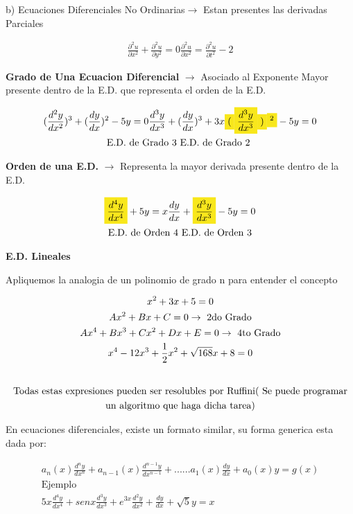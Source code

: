 \documentclass{article}
\begin{document}
b) Ecuaciones Diferenciales No Ordinarias$\rightarrow$  Estan presentes las derivadas Parciales


\begin{gather*}
\frac{\partial ^{2}u}{\partial x^{2}}+\frac{\partial ^{2}u}{\partial y^{2}} = 0       \frac{\partial ^{2}u}{\partial x^{2}}= \frac{\partial ^{2}u}{\partial t^{2}} -2
\end{gather*}


\textbf{Grado de Una Ecuacion Diferencial} $\rightarrow$  Asociado al \colorbox[RGB]{248,231,28}{Exponente Mayor} presente dentro de la E.D. que representa el orden de la E.D.


\begin{gather*}
(\frac{d^{2}y}{dx^{2}})^{3} + (\frac{dy}{dx})^{2}  - 5y = 0           \frac{d^{3}y}{dx^{3}} + (\frac{dy}{dx})^{3} +3x\text{\colorbox[RGB]{248,231,28}{$($}}\text{\colorbox[RGB]{248,231,28}{$\frac{d^{3}y}{dx^{3}}$}}\text{\colorbox[RGB]{248,231,28}{$)$}}\text{\colorbox[RGB]{248,231,28}{$^{2}$}}- 5y = 0  \\
\text{E.D. de Grado 3                           E.D. de Grado 2                       }
\end{gather*}


\textbf{Orden de una E.D.} $\rightarrow$  Representa la mayor derivada presente dentro de la E.D.


\begin{gather*}
\text{\colorbox[RGB]{248,231,28}{$\frac{d^{4}y}{dx^{4}}$}}+5y=x                     \frac{dy}{dx}+ \text{\colorbox[RGB]{248,231,28}{$\frac{d^{3}y}{dx^{3}}$}} - 5y = 0  \\
\text{E.D. de Orden 4                        E.D. de Orden 3}
\end{gather*}




\textbf{E.D. Lineales}

Apliquemos la analogia de un polinomio de grado n para entender el concepto


\begin{gather*}
x^{2}+3x+5 = 0 \\
Ax^{2}+Bx+C = 0  \rightarrow \text{ 2do Grado} \\
Ax^{4}+Bx^{3}+Cx^{2}+Dx+E = 0  \rightarrow \text{ 4to Grado} \\
x^{4}-12x^{3}+\frac{1}{2}x^{2}+\sqrt{168}x+8 = 0 \\
\vspace{0.5em} \\
\text{Todas estas expresiones pueden ser resolubles por Ruffini}(\text{ Se puede programar} \\
\text{un algoritmo que haga dicha tarea})
\end{gather*}


En ecuaciones diferenciales, existe un formato similar, su forma generica esta dada por:


\begin{gather*}
a_{n}(x)\frac{d^{n}y}{dx^{n}}+a_{n-1}(x)\frac{d^{n-1}y}{dx^{n-1}}+......a_{1}(x)\frac{dy}{dx}+ a_{0}(x)y = g(x) \\
\text{Ejemplo} \\
5x\frac{d^{4}y}{dx^{4}}+senx\frac{d^{3}y}{dx^{3}}+e^{3x}\frac{d^{2}y}{dx^{2}}+\frac{dy}{dx^{}} +\sqrt{5}y=x
\end{gather*}
\end{document}
